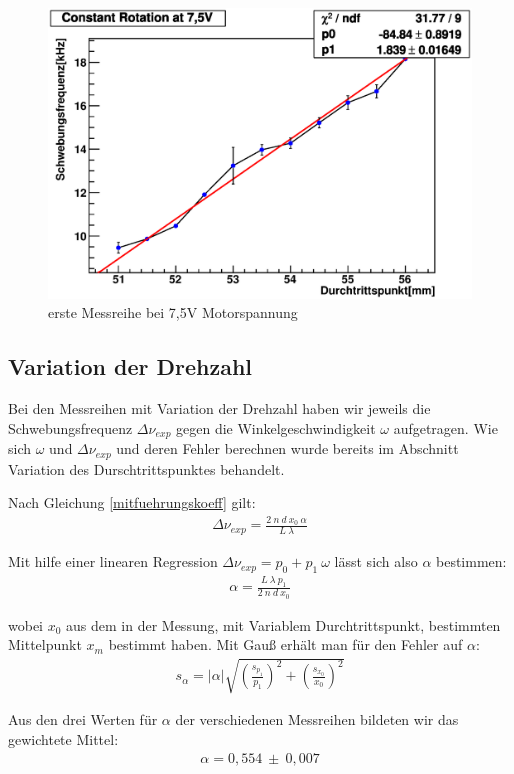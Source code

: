 \documentclass[12pt]{article}
\begin{document}
\begin{figure}[H]  
\centering
\includegraphics[width=0.7\linewidth]{pictures/7,5V1.eps}
\caption{erste Messreihe bei 7,5V Motorspannung}
\end{figure}

\subsection{Variation der Drehzahl}
Bei den Messreihen mit Variation der Drehzahl haben wir jeweils die Schwebungsfrequenz $\Delta\nu_{exp}$ gegen die Winkelgeschwindigkeit $\omega$
aufgetragen. Wie sich $\omega$ und $\Delta\nu_{exp}$ und deren Fehler berechnen wurde bereits im Abschnitt Variation des Durschtrittspunktes behandelt.

Nach Gleichung \ref{mitfuehrungskoeff} gilt:
\begin{align}
 \Delta\nu_{exp} = \frac{2 \ n \ d \ x_0 \ \alpha}{L \ \lambda}
\end{align}

Mit hilfe einer linearen Regression $\Delta\nu_{exp} = p_0 + p_1 \ \omega$ lässt sich also $\alpha$ bestimmen:
\begin{align}
 \alpha = \frac{L \ \lambda \ p_1}{2 \ n \ d \ x_0}
\end{align}

wobei $x_0$ aus dem in der Messung, mit Variablem Durchtrittspunkt, bestimmten Mittelpunkt $x_m$ bestimmt haben.
Mit Gauß erhält man für den Fehler auf $\alpha$:
\begin{align}
 s_{\alpha} = \lvert \alpha \rvert \sqrt{\left(\frac{s_{p_1}}{p_1}\right)^2 + \left(\frac{s_{x_0}}{x_0}\right)^2}
\end{align}

Aus den drei Werten für $\alpha$ der verschiedenen Messreihen bildeten wir das gewichtete Mittel:
\begin{align}
 \alpha = 0,554 \ \pm \ 0,007
\end{align}
\end{document}
